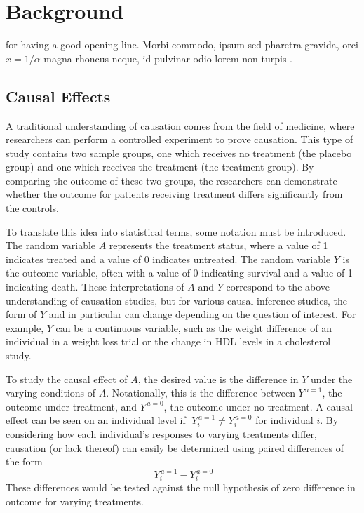 
\chapter{Background}

 for having a good opening line. Morbi commodo, ipsum sed pharetra gravida, orci  $x = 1/\alpha$ magna rhoncus neque, id pulvinar odio lorem non turpis \cite{Eigen1971, Knuth1968}. 


\section{Causal Effects} 

A traditional understanding of causation comes from the field of medicine, where researchers can perform a controlled experiment to prove causation.  This type of study contains two sample groups, one which receives no treatment (the placebo group) and one which receives the treatment (the treatment group).  By comparing the outcome of these two groups, the researchers can demonstrate whether the outcome for patients receiving treatment differs significantly from the controls.  

To translate this idea into statistical terms, some notation must be introduced.  The random variable $A$ represents the treatment status, where a value of 1 indicates treated and a value of 0 indicates untreated.  The random variable $Y$ is the outcome variable, often with a value of 0 indicating survival and a value of 1 indicating death.  These interpretations of $A$ and $Y$ correspond to the above understanding of causation studies, but for various causal inference studies, the form of $Y$ and  in particular can change depending on the question of interest.  For example, $Y$ can be a continuous variable, such as the weight difference of an individual in a weight loss trial or the change in HDL levels in a cholesterol study. 

To study the causal effect of $A$, the desired value is the difference in $Y$ under the varying conditions of $A$.  Notationally, this is the difference between $Y^{\, a=1}$, the outcome under treatment, and $Y^{\, a=0}$, the outcome under no treatment.  A causal effect can be seen on an individual level if $\; Y_i^{\, a=1} \neq Y_i^{\, a=0}$ for individual $i$.  By considering how each individual's responses to varying treatments differ, causation (or lack thereof) can easily be determined using paired differences of the form 
$$\; Y_i^{\, a=1} - Y_i^{\, a=0}$$ 
These differences would be tested against the null hypothesis of zero difference in outcome for varying treatments.  

